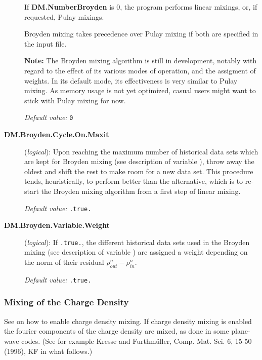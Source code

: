 \begin{description}
If \textbf{DM.NumberBroyden} is 0, the program performs linear mixings,
or, if requested, Pulay mixings.

Broyden mixing takes precedence over Pulay mixing if both are
specified in the input file.

\textbf{Note:} The Broyden mixing algorithm is still in development,
notably with regard to the effect of its various modes of operation, and
the assigment of weights. In its default mode, its effectiveness is
very similar to Pulay mixing. As memory usage is not yet optimized,
casual users might want to stick with Pulay mixing for now.

\textit{Default value:} \texttt{0}

\item[\textbf{DM.Broyden.Cycle.On.Maxit}] (\textit{logical}):
Upon reaching the maximum number of historical data sets which are
kept for Broyden mixing (see description of variable ), throw away the oldest and shift the rest to make
room for a new data set. This procedure tends, heuristically, to
perform better than the alternative, which is to re-start the Broyden
mixing algorithm from a first step of linear mixing.

\textit{Default value:} \texttt{.true.}

\item[\textbf{DM.Broyden.Variable.Weight}] (\textit{logical}):
If \texttt{.true.}, the different historical data sets used in
the Broyden mixing (see description of variable ) are assigned a weight depending on the
norm of their residual $\rho^n_{out}-\rho^n_{in}$.

\textit{Default value:} \texttt{.true.}


\end{description}

\fi


\subsubsection{Mixing of the Charge Density}

See  on how to enable charge density mixing.  If charge
density mixing is enabled the fourier components of the charge density
are mixed, as done in some plane-wave codes. (See for example Kresse
and Furthm\"uller, Comp. Mat. Sci. 6, 15-50 (1996), KF in what
follows.)


